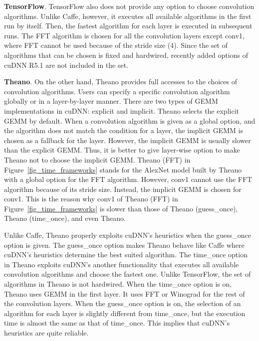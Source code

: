 {\bf TensorFlow}. TensorFlow also does not provide any option to choose convolution algorithms. Unlike Caffe, however, it executes all available algorithms in the first run by itself. Then, the fastest algorithm for each layer is executed in subsequent runs. The FFT algorithm is chosen for all the convolution layers except \textsf{conv1}, where FFT cannot be used because of the stride size (4). Since the set of algorithms that can be chosen is fixed and hardwired, recently added options of cuDNN R5.1 are not included in the set.

{\bf Theano}. On the other hand, Theano provides full accesses to the choices of convolution algorithms. Users can specify a specific convolution algorithm globally or in a layer-by-layer manner. There are two types of GEMM implementations in cuDNN: explicit and implicit. Theano selects the explicit GEMM by default. When a convolution algorithm is given as a global option, and the algorithm does not match the condition for a layer, the implicit GEMM is chosen as a fallback for the layer. However, the implicit GEMM is usually slower than the explicit GEMM. Thus, it is better to give layer-wise option to make Theano not to choose the implicit GEMM. \textsf{Theano (FFT)} in Figure~\ref{fig_time_frameworks} stands for the AlexNet model built by Theano with a global option for the FFT algorithm. However, \textsf{conv1} cannot use the FFT algorithm because of its stride size. Instead, the implicit GEMM is chosen for \textsf{conv1}. This is the reason why \textsf{conv1} of \textsf{Theano (FFT)} in Figure~\ref{fig_time_frameworks} is slower than those of \textsf{Theano (guess\_once)}, \textsf{Theano (time\_once)}, and even \textsf{Theano}. 

Unlike Caffe, Theano properly exploits cuDNN's heuristics when the \textsf{guess\_once} option is given. The \textsf{guess\_once} option makes Theano behave like Caffe where cuDNN's heuristics determine the best suited algorithm. The \textsf{time\_once} option in Theano exploits cuDNN's another functionality that executes all available convolution algorithms and choose the fastest one. Unlike TensorFlow, the set of algorithms in Theano is not hardwired. When the \textsf{time\_once} option is on, Theano uses GEMM in the first layer. It uses FFT or Winograd for the rest of the convolution layers. When the \textsf{guess\_once} option is on, the selection of an algorithm for each layer is slightly different from \textsf{time\_once}, but the execution time is almost the same as that of \textsf{time\_once}. This implies that cuDNN's heuristics are quite reliable.

